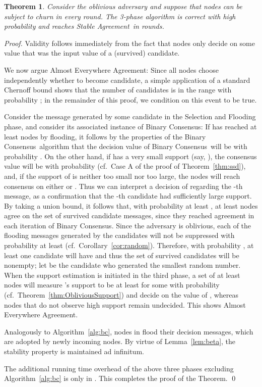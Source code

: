 \documentclass[leqno,11pt]{article}
\newtheorem{theorem}{Theorem}[section]
\newcommand{\sa}{{\sc Stable Agreement}}
\newcommand{\bc}{{\sc Binary Consensus}}
\begin{document}
\begin{theorem}\label{thm:sa}
Consider the oblivious adversary and suppose that 
nodes can be subject to churn in every round. The 3-phase
algorithm is correct with high probability and reaches \sa\ in 
rounds.
\end{theorem}
\begin{proof}
  Validity follows immediately from the fact that nodes only decide on some value that was the input value of a (survived) candidate.

  We now argue Almost Everywhere Agreement:
  Since all nodes choose independently whether to become candidate, a simple application of a standard Chernoff bound shows that the number of candidates is in the range  with probability ; in the remainder of this proof, we condition on this event to be true.

  Consider the message  generated by some candidate  in the Selection and Flooding phase, and consider its associated instance of \bc:
If  has reached at least  nodes by flooding, it follows by the properties of the \bc\ algorithm that the decision value of \bc\ will be  with probability .
On the other hand, if  has a very small support (say, ), the consensus value will be
 with probability  (cf.\ Case A of the proof of Theorem~\ref{thm:ssd}),
  and, if the support of  is neither too small nor too large, the nodes
  will reach consensus on either  or . 
  Thus we can interpret a decision of  regarding the -th message, as a confirmation that the -th candidate had sufficiently large support.
  By taking a union bound, it follows that, with probability at least , at least  nodes agree
  on the set of survived candidate messages, since they reached agreement in each iteration of \bc.
Since the adversary is oblivious, each of
the  flooding messages generated by the candidates will not be suppressed with probability at least  (cf.\ Corollary~\ref{cor:random}).
Therefore, with probability , at least one candidate  will have  and thus the set of survived candidates  will be nonempty; let  be the candidate who generated the smallest random number.
When the support estimation is initiated in the third phase, a set of at least
 nodes will measure 's support to be at least 
for some  with probability  (cf.\
Theorem~\ref{thm:ObliviousSupport}) and decide on the value  of ,
whereas nodes that do not observe high support remain undecided.
This shows Almost Everywhere Agreement. 

Analogously to Algorithm~\ref{alg:bc}, nodes in  flood their decision
messages, which are adopted by newly incoming nodes. By virtue of
Lemma~\ref{lem:beta}, the stability property is maintained ad infinitum.

The additional running time overhead of the above three phases excluding 
Algorithm~\ref{alg:bc} is only in . This completes the proof of the Theorem.
\qed
\end{proof}
\end{document}
